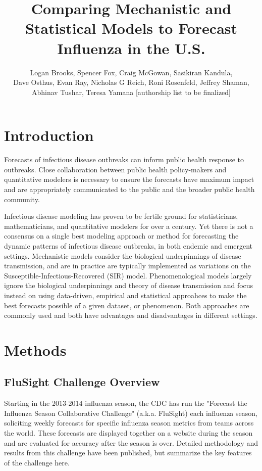 \documentclass{article}\usepackage[]{graphicx}\usepackage[]{color}
\title{Comparing Mechanistic and Statistical Models to Forecast Influenza in the U.S.}
\author{Logan Brooks, Spencer Fox, Craig McGowan, Sasikiran Kandula, \\ Dave Osthus, Evan Ray, Nicholas G Reich, Roni Rosenfeld, Jeffrey Shaman, \\Abhinav Tushar, Teresa Yamana [authorship list to be finalized]}
\begin{document}
\maketitle

\tableofcontents




\section{Introduction}
Forecasts of infectious disease outbreaks can inform public health response to outbreaks. Close collaboration between public health policy-makers and quantitative modelers is necessary to ensure the forecasts have maximum impact and are appropriately communicated to the public and the broader public health community. 

Infectious disease modeling has proven to be fertile ground for statisticians, mathematicians, and quantitative modelers for over a century. Yet there is not a consensus on a single best modeling approach or method for forecasting the dynamic patterns of infectious disease outbreaks, in both endemic and emergent settings. Mechanistic models consider the biological underpinnings of disease transmission, and are in practice are typically implemented as variations on the Susceptible-Infectious-Recovered (SIR) model. Phenomenological models largely ignore the biological underpinnings and theory of disease transmission and focus instead on using data-driven, empirical and statistical approahces to make the best forecasts possible of a given dataset, or phenomenon. Both approaches are commonly used and both have advantages and disadvantages in different settings.   


\section{Methods}

\subsection{FluSight Challenge Overview}

Starting in the 2013-2014 influenza season, the CDC has run the "Forecast the Influenza Season Collaborative Challenge" (a.k.a. FluSight) each influenza season, soliciting weekly forecasts for specific influenza season metrics from teams across the world. These forecasts are displayed together on a website during the season and are evaluated for accuracy after the season is over.\cite{PhiResearchLab} 
Detailed methodology and results from this challenge have been published\cite{Biggerstaff2016}, but summarize the key features of the challenge here.
\end{document}
